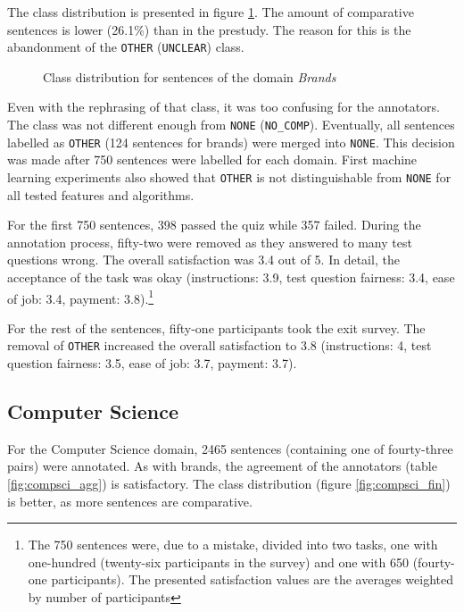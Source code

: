 The class distribution is presented in figure \ref{fig:brands_fin}. The amount of comparative sentences is lower (26.1\%) than in the prestudy. The reason for this is the abandonment of the \texttt{OTHER} (\texttt{UNCLEAR}) class. 

\begin{figure}[h]
\centering
\caption{Class distribution for sentences of the domain \emph{Brands}}
\label{fig:brands_fin}
\end{figure}



Even with the rephrasing of that class, it was too confusing for the annotators. The class was not different enough from \texttt{NONE} (\texttt{NO\_COMP}). Eventually, all sentences labelled as \texttt{OTHER} (124 sentences for brands) were merged into \texttt{NONE}. This decision was made after 750 sentences were labelled for each domain. First machine learning experiments also showed that \texttt{OTHER} is not distinguishable from \texttt{NONE} for all tested features and algorithms.

For the first 750 sentences, 398 passed the quiz while 357 failed. During the annotation process, fifty-two were removed as they answered to many test questions wrong. The overall satisfaction was 3.4 out of 5. In detail, the acceptance of the task was okay (instructions: 3.9, test question fairness: 3.4, ease of job: 3.4, payment: 3.8).\footnote{The 750 sentences were, due to a mistake, divided into two tasks, one with one-hundred (twenty-six participants in the survey) and one with 650 (fourty-one participants). The presented satisfaction values are the averages weighted by number of participants}

For the rest of the sentences, fifty-one participants took the exit survey. The removal of \texttt{OTHER} increased the overall satisfaction to 3.8 (instructions: 4, test question fairness: 3.5, ease of job: 3.7, payment: 3.7).


\subsection{Computer Science}

For the Computer Science domain, 2465 sentences (containing one of fourty-three pairs) were annotated. As with brands, the agreement of the annotators (table \ref{fig:compsci_agg}) is satisfactory. The class distribution (figure \ref{fig:compsci_fin}) is better, as more sentences are comparative.

